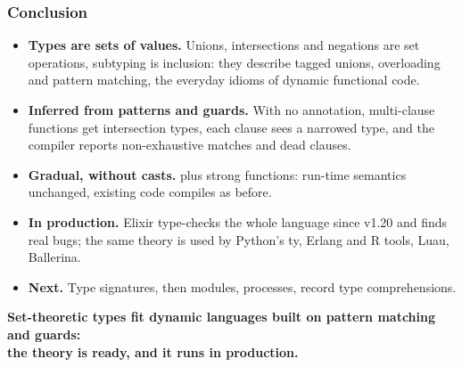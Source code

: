 \begin{frame}
\frametitle{Conclusion}\vspace{-2mm}
{\small
\begin{itemize}\setlength{\itemsep}{4pt}
  \item \textbf{\color{darkslateblue}Types are sets of values.}
    Unions, intersections and negations are set operations, subtyping is inclusion:
    they describe tagged unions, overloading and pattern matching, the everyday idioms
    of dynamic functional code.
  \item \textbf{\color{darkslateblue}Inferred from patterns and guards.}
    With no annotation, multi-clause functions get intersection types, each clause sees
    a narrowed type, and the compiler reports non-exhaustive matches and dead clauses.
  \item \textbf{\color{darkslateblue}Gradual, without casts.}
     plus strong functions: run-time semantics unchanged, existing
    code compiles as before.
  \item \textbf{\color{darkslateblue}In production.}
    Elixir type-checks the whole language since v1.20 and finds real bugs; the same
    theory is used by Python's \textsf{ty}, Erlang and R tools, Luau, Ballerina.
  \item \textbf{\color{darkslateblue}Next.}
    Type signatures, then modules, processes, record type comprehensions.
\end{itemize}}
\pause
\smallskip
{\centering\textbf{\color{darkslateblue}Set-theoretic types fit dynamic languages built on pattern matching and guards:\\
the theory is ready, and it runs in production.}\par}
\end{frame}
